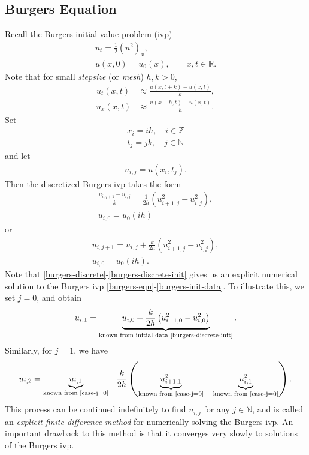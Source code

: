 \documentclass[12pt,reqno]{amsart}
\numberwithin{equation}{section}  %
\newcommand{\rr}{\mathbb{R}}
\begin{document}
\subsection{Burgers Equation}
Recall the Burgers initial value problem (ivp)
\begin{gather}
\label{burgers-eqn}
u_{t} = \frac{1}{2}(u^{2})_{x},
\\
\label{burgers-init-data}
u(x, 0) = u_{0}(x), \qquad x, t \in \rr.
\end{gather}
Note that for small \emph{stepsize} (or \emph{mesh}) $h, k >0$,
\begin{equation*}
\begin{split}
u_{t}(x,t) &\approx \frac{u(x, t+k) - u(x, t)}{k},
\\
u_{x}(x, t) & \approx \frac{u(x+h, t) - u(x, t)}{h}.
\end{split}
\end{equation*}
Set
\begin{gather*}
x_i = ih, \quad i \in \mathbb{Z}
\\
t_{j}=jk, \quad j \in \mathbb{N}
\end{gather*}
and let
\begin{gather*}
u_{i,j} = u(x_{i}, t_{j}).
\end{gather*}
Then the discretized Burgers ivp takes the form
\begin{gather*}
\frac{u_{i, j+1}- u_{i,j}}{k}=\frac{1}{2h}\left( u_{i+1,j}^{2} -
u_{i,j}^{2} \right),
\\
u_{i,0} = u_{0}(ih)
\end{gather*}
or
\begin{gather}
\label{burgers-discrete}
u_{i, j+1}=u_{i,j} + \frac{k}{2h}\left( u_{i+1,j}^{2} -
u_{i,j}^{2} \right),
\\
\label{burgers-discrete-init}
u_{i,0} = u_{0}(ih).
\end{gather}
Note that \eqref{burgers-discrete}-\eqref{burgers-discrete-init} gives us an
explicit numerical solution to the Burgers ivp
\eqref{burgers-eqn}-\eqref{burgers-init-data}. To illustrate this, we set
$j=0$, and obtain
\begin{equation}
\label{case-j=0}
\begin{split}
u_{i,1} = \underbrace{u_{i,0} + \frac{k}{2h}\left( u_{i+1,0}^{2} -
u_{i,0}^{2} \right)}_{\text{known from initial data
\eqref{burgers-discrete-init}}}.
\end{split}
\end{equation}
Similarly, for $j=1$, we have
\begin{equation*}
\begin{split}
u_{i,2} = \underbrace{u_{i,1}}_{\text{known from
\eqref{case-j=0}}} + \frac{k}{2h}\left(
\underbrace{u_{i+1,1}^{2}}_{\text{known from \eqref{case-j=0}}} -
\underbrace{u_{i,1}^{2}}_{\text{known from
\eqref{case-j=0}}} \right).
\end{split}
\end{equation*} 
This process can be
continued indefinitely to find $u_{i, j}$ for any $j \in \mathbb{N}$, and is
called an \emph{explicit finite difference method} for numerically solving the
Burgers ivp. An important drawback to this method is that it converges very
slowly to solutions of the Burgers ivp.
\end{document}
